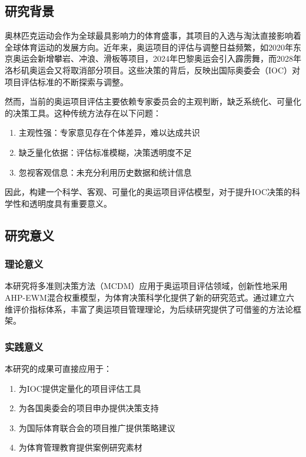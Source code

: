 
\subsection{研究背景}

奥林匹克运动会作为全球最具影响力的体育盛事，其项目的入选与淘汰直接影响着全球体育运动的发展方向。近年来，奥运项目的评估与调整日益频繁，如2020年东京奥运会新增攀岩、冲浪、滑板等项目，2024年巴黎奥运会引入霹雳舞，而2028年洛杉矶奥运会又将取消部分项目。这些决策的背后，反映出国际奥委会（IOC）对项目评估标准的不断探索与调整。

然而，当前的奥运项目评估主要依赖专家委员会的主观判断，缺乏系统化、可量化的决策工具。这种传统方法存在以下问题：
\begin{enumerate}
\item 主观性强：专家意见存在个体差异，难以达成共识
\item 缺乏量化依据：评估标准模糊，决策透明度不足
\item 忽视客观信息：未充分利用历史数据和统计信息
\end{enumerate}

因此，构建一个科学、客观、可量化的奥运项目评估模型，对于提升IOC决策的科学性和透明度具有重要意义。

\subsection{研究意义}

\subsubsection{理论意义}

本研究将多准则决策方法（MCDM）应用于奥运项目评估领域，创新性地采用AHP-EWM混合权重模型，为体育决策科学化提供了新的研究范式。通过建立六维评价指标体系，丰富了奥运项目管理理论，为后续研究提供了可借鉴的方法论框架。

\subsubsection{实践意义}

本研究的成果可直接应用于：
\begin{enumerate}
\item 为IOC提供定量化的项目评估工具
\item 为各国奥委会的项目申办提供决策支持
\item 为国际体育联合会的项目推广提供策略建议
\item 为体育管理教育提供案例研究素材
\end{enumerate}

